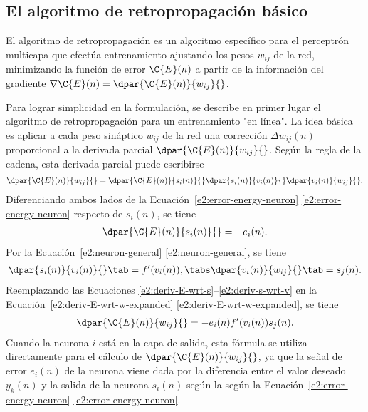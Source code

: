 %
%
\subsection{El algoritmo de retropropagación básico}
%
El algoritmo de retropropagación es un algoritmo específico para el
perceptrón multicapa que efectúa entrenamiento ajustando los pesos
$w_{ij}$ de la red, minimizando la función de error
$\C{E}(n)$ a partir de la información del gradiente
$\nabla\C{E}(n)=\dpar{\C{E}(n)}{w_{ij}}{}$.

Para lograr simplicidad en la formulación, se describe
en primer lugar el algoritmo de retropropagación para un entrenamiento "en línea".
La idea básica es aplicar a cada
peso sináptico $w_{ij}$ de la red una corrección
$\Delta{}w_{ij}(n)$ proporcional a la derivada parcial
$\dpar{\C{E}(n)}{w_{ij}}{}$.  Según la regla de la cadena, esta
derivada parcial puede escribirse
%
\begin{align}\label{e2:deriv-E-wrt-w-expanded}
  \dpar{\C{E}(n)}{w_{ij}}{} = \dpar{\C{E}(n)}{s_i(n)}{}
  \dpar{s_i(n)}{v_i(n)}{} \dpar{v_i(n)}{w_{ij}}{}.
\end{align}
%
Diferenciando ambos lados de la
\iflatexml{}Ecuación~\ref{e2:error-energy-neuron}
\else\autoref{e2:error-energy-neuron}\fi{} respecto de $s_i(n)$, se tiene
%
\begin{align}\label{e2:deriv-E-wrt-s}
  \dpar{\C{E}(n)}{s_i(n)}{} = -e_i(n).
\end{align}
%
Por la \iflatexml{}Ecuación~\ref{e2:neuron-general}
\else\autoref{e2:neuron-general}\fi, se tiene
%
\begin{align}\label{e2:deriv-s-wrt-v}
  \dpar{s_i(n)}{v_i(n)}{} \tab = f'(v_i(n)),\tabs
  \dpar{v_i(n)}{w_{ij}}{} \tab = s_j(n).
\end{align}
%
Reemplazando las Ecuaciones
\ref{e2:deriv-E-wrt-s}--\ref{e2:deriv-s-wrt-v} en la
\iflatexml{}Ecuación~\ref{e2:deriv-E-wrt-w-expanded}
\else\autoref{e2:deriv-E-wrt-w-expanded}\fi, se tiene
%
\begin{align}\label{e2:deriv-E-wrt-w}
  \dpar{\C{E}(n)}{w_{ij}}{} = -e_i(n) f'(v_i(n)) s_j(n).
\end{align}
%
Cuando la neurona $i$ está en la capa de salida, esta fórmula se
utiliza directamente para el cálculo de $\dpar{\C{E}(n)}{w_{ij}}{}$,
ya que la señal de error $e_i(n)$ de la neurona viene dada por la
diferencia entre el valor deseado $y_k(n)$ y la salida de la neurona
$s_i(n)$ según la según la
\iflatexml{}Ecuación~\ref{e2:error-energy-neuron}
\else\autoref{e2:error-energy-neuron}\fi.

